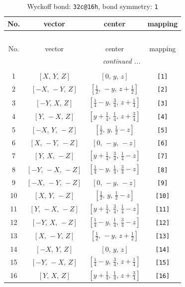 \documentclass[fleqn,8pt]{jsarticle}
\begin{document}
\begin{longtable}{cccc}
\caption{Wyckoff bond: {\tt 32c@16h}, bond symmetry: {\tt 1}}
 \\
 \hline \hline
No. & vector & center & mapping \\ \hline \endfirsthead

\multicolumn{3}{l}{\tablename\ \thetable{}} \\
 \hline \hline
No. & vector & center & mapping \\ \hline \endhead

 \hline \hline
\multicolumn{3}{r}{\footnotesize\it continued ...} \\ \endfoot

 \hline \hline
\multicolumn{3}{r}{} \\ \endlastfoot

1 & $\left[ X,\, Y,\, Z \right]$ & $\left[ 0,\, y,\, z \right]$ & {\tt [1]} \\ \hline
2 & $\left[ - X,\, - Y,\, Z \right]$ & $\left[ \frac{1}{2},\, - y,\, z + \frac{1}{2} \right]$ & {\tt [2]} \\ \hline
3 & $\left[ - Y,\, X,\, Z \right]$ & $\left[ \frac{1}{4} - y,\, \frac{3}{4},\, z + \frac{1}{4} \right]$ & {\tt [3]} \\ \hline
4 & $\left[ Y,\, - X,\, Z \right]$ & $\left[ y + \frac{1}{4},\, \frac{1}{4},\, z + \frac{3}{4} \right]$ & {\tt [4]} \\ \hline
5 & $\left[ - X,\, Y,\, - Z \right]$ & $\left[ \frac{1}{2},\, y,\, \frac{1}{2} - z \right]$ & {\tt [5]} \\ \hline
6 & $\left[ X,\, - Y,\, - Z \right]$ & $\left[ 0,\, - y,\, - z \right]$ & {\tt [6]} \\ \hline
7 & $\left[ Y,\, X,\, - Z \right]$ & $\left[ y + \frac{1}{4},\, \frac{3}{4},\, \frac{1}{4} - z \right]$ & {\tt [7]} \\ \hline
8 & $\left[ - Y,\, - X,\, - Z \right]$ & $\left[ \frac{1}{4} - y,\, \frac{1}{4},\, \frac{3}{4} - z \right]$ & {\tt [8]} \\ \hline
9 & $\left[ - X,\, - Y,\, - Z \right]$ & $\left[ 0,\, - y,\, - z \right]$ & {\tt [9]} \\ \hline
10 & $\left[ X,\, Y,\, - Z \right]$ & $\left[ \frac{1}{2},\, y,\, \frac{1}{2} - z \right]$ & {\tt [10]} \\ \hline
11 & $\left[ Y,\, - X,\, - Z \right]$ & $\left[ y + \frac{1}{4},\, \frac{3}{4},\, \frac{1}{4} - z \right]$ & {\tt [11]} \\ \hline
12 & $\left[ - Y,\, X,\, - Z \right]$ & $\left[ \frac{1}{4} - y,\, \frac{1}{4},\, \frac{3}{4} - z \right]$ & {\tt [12]} \\ \hline
13 & $\left[ X,\, - Y,\, Z \right]$ & $\left[ \frac{1}{2},\, - y,\, z + \frac{1}{2} \right]$ & {\tt [13]} \\ \hline
14 & $\left[ - X,\, Y,\, Z \right]$ & $\left[ 0,\, y,\, z \right]$ & {\tt [14]} \\ \hline
15 & $\left[ - Y,\, - X,\, Z \right]$ & $\left[ \frac{1}{4} - y,\, \frac{3}{4},\, z + \frac{1}{4} \right]$ & {\tt [15]} \\ \hline
16 & $\left[ Y,\, X,\, Z \right]$ & $\left[ y + \frac{1}{4},\, \frac{1}{4},\, z + \frac{3}{4} \right]$ & {\tt [16]} \\
\end{longtable}
\end{document}
